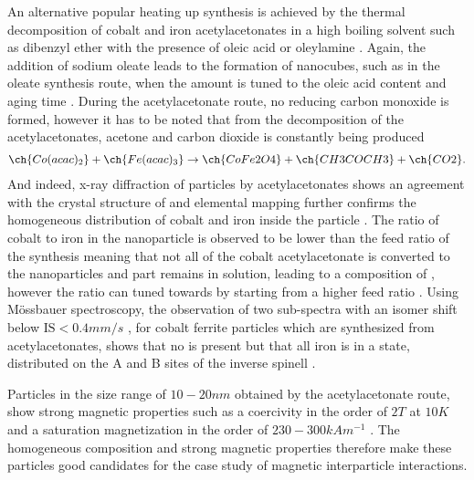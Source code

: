 \documentclass[\main/dresen_thesis.tex]{subfiles}
\begin{document}
  An alternative popular heating up synthesis is achieved by the thermal decomposition of cobalt and iron acetylacetonates in a high boiling solvent such as dibenzyl ether with the presence of oleic acid or oleylamine \cite{Sun_2002_SizeC, Wu_2014_Monol}.
  Again, the addition of sodium oleate leads to the formation of nanocubes, such as in the oleate synthesis route, when the amount is tuned to the oleic acid content and aging time \cite{Wu_2014_Monol}.
  During the acetylacetonate route, no reducing carbon monoxide is formed, however it has to be noted that from the decomposition of the acetylacetonates, acetone and carbon dioxide is constantly being produced \cite{Lu_2015_Synth}
  \begin{align}
    \ch{Co(acac)_2} + \ch{Fe(acac)_3} \rightarrow \ch{CoFe2O4} + \ch{CH3COCH3} + \ch{CO2}.
  \end{align}
  And indeed, x-ray diffraction of particles by acetylacetonates shows an agreement with the crystal structure of  \cite{Wu_2014_Monol, Sathya_2016_Cofeo} and elemental mapping further confirms the homogeneous distribution of cobalt and iron inside the particle \cite{Sathya_2016_Cofeo}.
  The ratio of cobalt to iron in the nanoparticle is observed to be lower than the feed ratio of the synthesis meaning that not all of the cobalt acetylacetonate is converted to the nanoparticles and part remains in solution, leading to a composition of , however the ratio can tuned towards  by starting from a higher feed ratio  \cite{Sathya_2016_Cofeo, Yu_2013_Cobal, Wu_2014_Monol}.
  Using M\"ossbauer spectroscopy, the observation of two sub-spectra with an isomer shift below $\mathrm{IS} < 0.4 \unit{mm/s}$ \cite{Pianciola_2014_Sizea}, for cobalt ferrite particles which are synthesized from acetylacetonates, shows that no  is present but that all iron is in a  state, distributed on the A and B sites of the inverse spinell \cite{Angotzi_2017_Spine, Figuera_2015_Moess}.

  Particles in the size range of $10 - 20 \unit{nm}$ obtained by the acetylacetonate route, show strong magnetic properties such as a coercivity in the order of $2 \unit{T}$ at $10 \unit{K}$ \cite{Sun_2002_SizeC, Sathya_2016_Cofeo} and a saturation magnetization in the order of $230 - 300 \unit{kA m^{-1}}$ \cite{Wu_2014_Monol, Sathya_2016_Cofeo}.
  The homogeneous composition and strong magnetic properties therefore make these particles good candidates for the case study of magnetic interparticle interactions.
  \\
\end{document}
